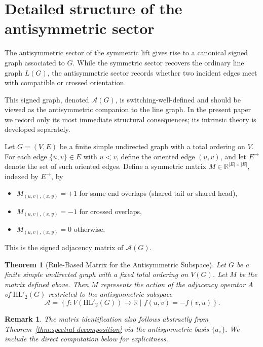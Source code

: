 \documentclass[11pt]{article}
\newtheorem{theorem}{Theorem}
\newtheorem{remark}{Remark}
\theoremstyle{plain}
\begin{document}
\section{Detailed structure of the antisymmetric sector}\label{sec:antisym}

The antisymmetric sector of the symmetric lift gives rise to a canonical signed graph associated to \(G\).
While the symmetric sector recovers the ordinary line graph \(L(G)\), the antisymmetric sector records whether
two incident edges meet with compatible or crossed orientation.

This signed graph, denoted \(\mathcal A(G)\), is switching-well-defined and should be viewed as the antisymmetric
companion to the line graph. In the present paper we record only its most immediate structural consequences;
its intrinsic theory is developed separately.

Let \(G=(V,E)\) be a finite simple undirected graph with a total ordering on \(V\). For each edge
\(\{u,v\}\in E\) with \(u<v\), define the oriented edge \((u,v)\), and let \(E^\rightarrow\) denote the
set of such oriented edges. Define a symmetric matrix \(M\in\mathbb{R}^{|E|\times |E|}\), indexed by
\(E^\rightarrow\), by
\begin{itemize}
    \item \(M_{(u,v),(x,y)}=+1\) for same-end overlaps (shared tail or shared head),
    \item \(M_{(u,v),(x,y)}=-1\) for crossed overlaps,
    \item \(M_{(u,v),(x,y)}=0\) otherwise.
\end{itemize}
This is the signed adjacency matrix of \(\mathcal A(G)\).

\begin{theorem}[Rule-Based Matrix for the Antisymmetric Subspace]
Let $G$ be a finite simple undirected graph with a fixed total ordering on $V(G)$. Let $M$ be the matrix defined above. Then $M$ represents the action of the adjacency operator $A$ of $\mathrm{HL}'_2(G)$ restricted to the antisymmetric subspace
\[
\mathcal{A} = \left\{ f: V(\mathrm{HL}'_2(G)) \to \mathbb{R} \mid f(u,v) = -f(v,u) \right\}.
\]
\end{theorem}

\begin{remark}
The matrix identification also follows abstractly from Theorem~\ref{thm:spectral-decomposition} via the
antisymmetric basis \(\{a_e\}\). We include the direct computation below for explicitness.
\end{remark}
\end{document}
